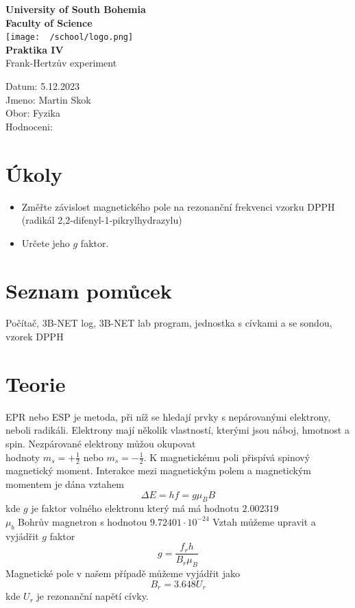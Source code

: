 \documentclass{article}
\begin{document}
\begin{center}
\textbf{\Huge{University of South Bohemia}}\\
\vspace{50px}
\textbf{\Large{Faculty of Science}} \\
\vspace{30px}
\texttt{[image: ~/school/logo.png]} \\
\vspace{30px}
\textbf{\large{Praktika IV}}
\vspace{20px}
\\
\vspace{20px}
\large{Frank-Hertzův experiment} \\
\vspace{60px}
\end{center}
\begin{flushleft}
Datum: 5.12.2023 \\
Jmeno: Martin Skok \\
Obor: Fyzika \\
Hodnoceni:
\end{flushleft}
\newpage
\section{Úkoly}
\begin{itemize}
\item Změřte závislost magnetického pole na rezonanční frekvenci vzorku DPPH (radikál 2,2-difenyl-1-pikrylhydrazylu) \\
\item Určete jeho $g$ faktor.
\end{itemize}
\section{Seznam pomůcek}
Počítač, 3B-NET log, 3B-NET lab program, jednostka s cívkami a se sondou, vzorek DPPH
\section{Teorie}
EPR nebo ESP je metoda, při níž se hledají prvky s nepárovanými elektrony, neboli radikáli.
Elektrony mají několik vlastností, kterými jsou náboj, hmotnost a spin. Nezpárované elektrony můžou okupovat \\ hodnoty $m_{s} = + \frac{1}{2}$ nebo $m_{s} = - \frac{1}{2}$.
K magnetickému poli přispívá spinový magnetický moment. Interakce mezi magnetickým polem a magnetickým momentem je dána vztahem
\begin{equation}
  \Delta E = h f = g \mu_{B} B
\end{equation}
kde $g$ je faktor volného elektronu který má má hodnotu $2.002319$\\
$\mu_{b}$ Bohrův magnetron s hodnotou $9.72401\cdot 10^{-24}$
Vztah můžeme upravit a vyjádřit $g$ faktor
\begin{equation}
  g = \frac{f_{r}h}{B_{r}\mu_{B}}
\end{equation}
Magnetické pole v našem případě můžeme vyjádřit jako
\begin{equation}
  B_{r} = 3.648 U_{r}
\end{equation}
kde $U_{r}$ je rezonanční napětí cívky.
\end{document}
